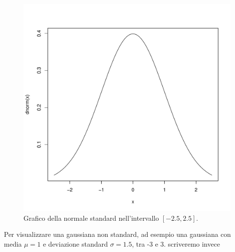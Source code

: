 \documentclass[onecolumn,12pt]{book}\usepackage[]{graphicx}\usepackage[]{color}
\makeatletter
\def\maxwidth{ %
  \ifdim\Gin@nat@width>\linewidth
    \linewidth
  \else
    \Gin@nat@width
  \fi
}
\newenvironment{knitrout}{}{} %
\makeatother
\begin{document}
\begin{figure}[htbp]
\begin{center}
\begin{knitrout}
\color{fgcolor}
\includegraphics[width=\maxwidth]{figure/unnamed-chunk-139-1} 

\end{knitrout}
\caption{ Grafico della normale standard nell'intervallo $[-2.5,2.5]$. }
\label{fig:normalesta}
\end{center}
\end{figure}
Per  visualizzare una gaussiana non standard, ad esempio una gaussiana con media $\mu=1$ e  deviazione standard $\sigma=1.5$, tra -3 e 3. scriveremo invece
\end{document}
